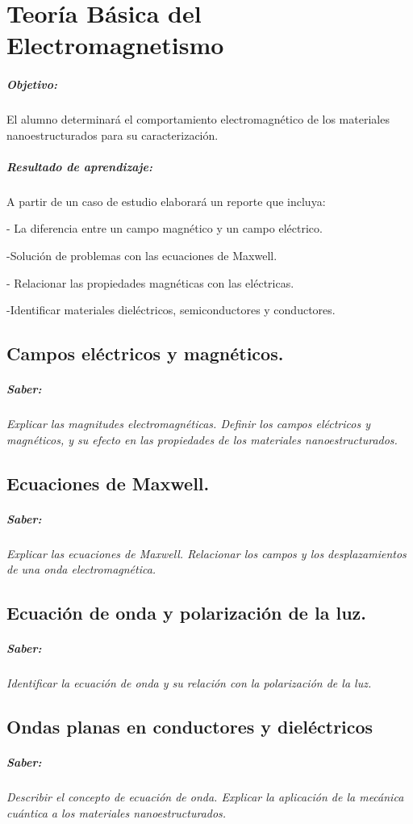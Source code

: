 \chapter{Teoría Básica del Electromagnetismo}
\paragraph{Objetivo:}
El alumno determinará el comportamiento electromagnético de los materiales nanoestructurados para su caracterización.


\paragraph{Resultado de aprendizaje: }
A partir de un caso de estudio elaborará un reporte que incluya:

- La diferencia entre un campo magnético y un campo eléctrico.

-Solución de problemas con las ecuaciones de Maxwell.

- Relacionar las propiedades magnéticas con las eléctricas.

-Identificar materiales dieléctricos, semiconductores y conductores.

\section{Campos eléctricos y magnéticos.}
\paragraph{Saber: }
\textit{Explicar las magnitudes electromagnéticas. Definir los campos  eléctricos y magnéticos, y su efecto en las	propiedades de los materiales nanoestructurados.
}

\section{Ecuaciones de 	Maxwell.}
\paragraph{Saber: }
\textit{Explicar las ecuaciones de Maxwell. Relacionar los campos y los desplazamientos de una onda electromagnética.}

\section{Ecuación de onda y polarización de la luz.}
\paragraph{Saber: }
\textit{Identificar la ecuación de onda y su relación con la polarización de la luz.}

\section{Ondas planas en conductores y dieléctricos
}
\paragraph{Saber: }
\textit{Describir el concepto de ecuación de onda. Explicar la aplicación de la mecánica cuántica a los materiales nanoestructurados. }
